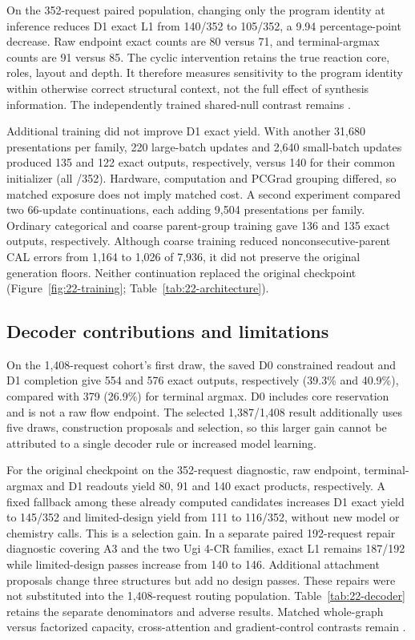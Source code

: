 On the 352-request paired population, changing only the program identity at inference reduces D1
exact L1 from 140/352 to 105/352, a 9.94 percentage-point decrease. Raw endpoint exact counts are
80 versus 71, and terminal-argmax counts are 91 versus 85. The cyclic intervention retains the true
reaction core, roles, layout and depth. It therefore measures sensitivity to the program identity
within otherwise correct structural context, not the full effect of synthesis information.
The independently trained shared-null contrast remains .

Additional training did not improve D1 exact yield. With another 31,680 presentations per family,
220 large-batch updates and 2,640 small-batch updates produced 135 and 122 exact outputs,
respectively, versus 140 for their common initializer (all /352). Hardware, computation and
PCGrad grouping differed, so matched exposure does not imply matched cost. A second experiment
compared two 66-update continuations, each adding 9,504 presentations per family. Ordinary
categorical and coarse parent-group training gave 136 and 135 exact outputs, respectively.
Although coarse training reduced nonconsecutive-parent CAL errors from 1,164 to 1,026 of 7,936,
it did not preserve the original generation floors. Neither continuation replaced the original
checkpoint (Figure~\ref{fig:22-training}; Table~\ref{tab:22-architecture}).

\subsection{Decoder contributions and limitations}
On the 1,408-request cohort's first draw, the saved D0 constrained readout and D1 completion
give 554 and 576 exact outputs, respectively (39.3\% and 40.9\%), compared with 379 (26.9\%)
for terminal argmax. D0 includes core reservation and is not a raw flow endpoint. The selected
1,387/1,408 result additionally uses five draws, construction proposals and selection, so this
larger gain cannot be attributed to a single decoder rule or increased model learning.

For the original checkpoint on the 352-request diagnostic, raw endpoint, terminal-argmax and D1
readouts yield 80, 91 and 140 exact products, respectively. A fixed fallback among these already
computed candidates increases D1 exact yield to 145/352 and limited-design yield from 111 to
116/352, without new model or chemistry calls. This is a selection gain. In a separate paired
192-request repair diagnostic covering A3 and the two Ugi 4-CR families, exact L1 remains 187/192
while limited-design passes increase from 140 to 146. Additional attachment proposals change three
structures but add no design passes. These repairs were not substituted into the 1,408-request
routing population. Table~\ref{tab:22-decoder} retains the separate denominators and adverse results.
Matched whole-graph versus factorized capacity, cross-attention and gradient-control contrasts
remain .


